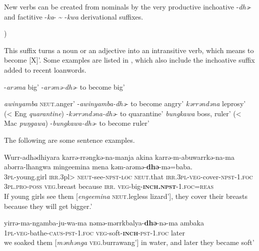 \documentclass[output=paper]{langscibook}
\begin{document}
New verbs can be created from nominals by the very productive inchoative -\textit{dhə}- and factitive -\textit{ka}- {\textasciitilde} -\textit{kwa} derivational suffixes.


\label{sec:vanegmond:2.3.2.1})


This suffix turns a noun or an adjective into an intransitive verb, which means to become [X]’. Some examples are listed in , which also include the inchoative suffix added to recent loanwords.



\ea%
 \label{ex:vanegmond:8}
\ea
\label{ex:vanegmond:8a}
 -\textit{arəma} big’ -\textit{arəmə-dhə}- to become big’

\ex
\label{ex:vanegmond:8b}
\textit{awinyamba} \textsc{neut}.anger’ -\textit{awinyamba-dhə}- to become angry’
 \ex
\textit{kərrəndəna} leprosy’ (< Eng \textit{quarantine}) -\textit{kərrəndəna-dhə}- to quarantine’
\ex
\textit{bungkawa} boss, ruler’ (< Mac \textit{puŋgawa}) -\textit{bungkawa-dhə}- to become ruler’
\z
\z



The following are some sentence examples.



\ea%
 \label{ex:vanegmond:9}
 \ea
 \label{ex:vanegmond:9a}
\gll Wurr-adhədhiyara karrə-rrəngkə-na-manja akina karrə-m-abuwarrkə-na-ma abərra-lhangwa mingeemina mena kəm-arəmə-\textbf{dhə}-mə=baba.\\
\textsc{3pl-}young.girl \textsc{irr}.3pl> \textsc{neut}-see-\textsc{npst}-\textsc{loc} \textsc{neut}.that \textsc{irr}.\textsc{3pl-veg}-cover-\textsc{npst}-1.\textsc{foc} \textsc{3pl}.\textsc{pro}-\textsc{poss} \textsc{veg}.breast because \textsc{irr}. \textsc{veg}-big-\textbf{\textsc{inch}}\textbf{.\textsc{npst}}-1.\textsc{foc}=\textsc{reas}\\
\glt If young girls see them [\textit{engeemina} \textsc{neut}.legless lizard’], they cover their breasts because they will get bigger.’


\ex
\label{ex:vanegmond:9b}
\gll yirrə-ma-ngamba-ju-wa-ma nəmə-mərrkbalya-\textbf{{dhə}}-nə-ma ambaka\\
\textsc{1pl}-\textsc{veg}-bathe-\textsc{caus}-\textsc{pst}-1.\textsc{foc} \textsc{veg}-soft-\textbf{\textsc{inch}}-\textsc{pst}-1.\textsc{foc} later\\
\glt we soaked them [\textit{mənhənga} \textsc{veg}.burrawang’] in water, and later they became soft’
\z
\z
\end{document}
